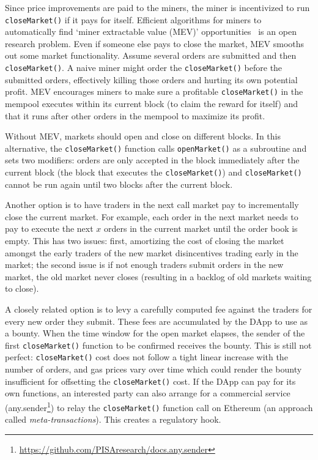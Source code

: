 Since price improvements are paid to the miners, the miner is incentivized to run \texttt{closeMarket()} if it pays for itself. Efficient algorithms for miners to automatically find `miner extractable value (MEV)' opportunities~\cite{daian2019flash} is an open research problem. Even if someone else pays to close the market, MEV smooths out some market functionality. Assume several orders are submitted and then \texttt{closeMarket()}. A naive miner might order the \texttt{closeMarket()} before the submitted orders, effectively killing those orders and hurting its own potential profit. MEV encourages miners to make sure a profitable \texttt{closeMarket()} in the mempool executes within its current block (to claim the reward for itself) and that it runs after other orders in the mempool to maximize its profit.

Without MEV, markets should open and close on different blocks. In this alternative, the \texttt{closeMarket()} function calls \texttt{openMarket()} as a subroutine and sets two modifiers: orders are only accepted in the block immediately after the current block (\ie the block that executes the \texttt{closeMarket()}) and \texttt{closeMarket()} cannot be run again until two blocks after the current block.

Another option is to have traders in the next call market pay to incrementally close the current market. For example, each order in the next market needs to pay to execute the next $x$ orders in the current market until the order book is empty. This has two issues: first, amortizing the cost of closing the market amongst the early traders of the new market disincentives trading early in the market; the second issue is if not enough traders submit orders in the new market, the old market never closes (resulting in a backlog of old markets waiting to close). 

A closely related option is to levy a carefully computed fee against the traders for every new order they submit. These fees are accumulated by the DApp to use as a bounty. When the time window for the open market elapses, the sender of the first \texttt{closeMarket()} function to be confirmed receives the bounty. This is still not perfect: \texttt{closeMarket()} cost does not follow a tight linear increase with the number of orders, and gas prices vary over time which could render the bounty insufficient for offsetting the \texttt{closeMarket()} cost.  If the DApp can pay for its own functions, an interested party can also arrange for a commercial service (\eg any.sender\footnote{\url{https://github.com/PISAresearch/docs.any.sender}}) to relay the \texttt{closeMarket()} function call on Ethereum (an approach called \textit{meta-transactions}). This creates a regulatory hook.


